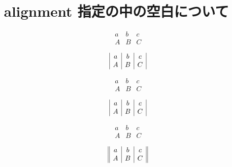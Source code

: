 \documentclass{article}
\begin{document}
\section{alignment 指定の中の空白について}

\[
\begin{array}{|c|c|c|}
  a & b & c\\
  A & B & C
\end{array}
\]

\[
\begin{array}{| c | c | c |}
  a & b & c\\
  A & B & C
\end{array}
\]

\[
\begin{array}{ |c|c|c| }
  a & b & c\\
  A & B & C
\end{array}
\]

\[
\begin{array}{
|c|c|
%
 c
|
}
  a & b & c\\
  A & B & C
\end{array}
\]

\[
\begin{array}{||c|c|c||}
  a & b & c\\
  A & B & C
\end{array}
\]

\[
\begin{array}{| |c|c|c| |}
  a & b & c\\
  A & B & C
\end{array}
\]
\end{document}
